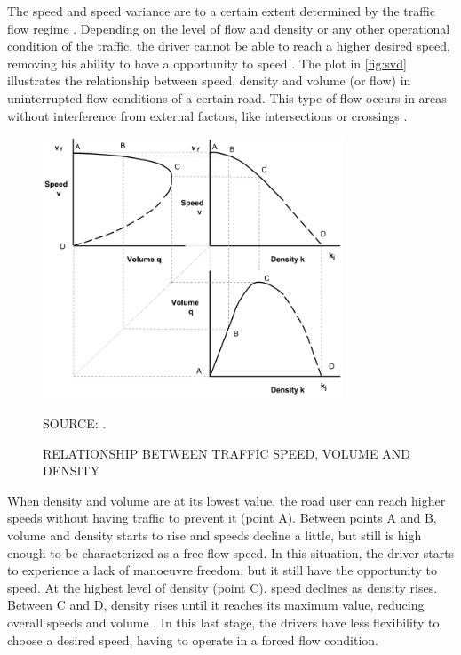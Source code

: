 The speed and speed variance are to a certain extent determined by the traffic flow regime \cite{Shinar2017}. Depending on the level of flow and density or any other operational condition of the traffic, the driver cannot be able to reach a higher desired speed, removing his ability to have a opportunity to speed \cite{Richard2013a, Bastos2021}. The plot in \autoref{fig:svd} illustrates the relationship between speed, density and volume (or flow) in uninterrupted flow conditions of a certain road. This type of flow occurs in areas without interference from external factors, like intersections or crossings \cite{Green2020}. 

\begin{figure}[!htbp]
    \centering\footnotesize
    \captionsetup{font=footnotesize}
    \caption{RELATIONSHIP BETWEEN TRAFFIC SPEED, VOLUME AND DENSITY}
    \includegraphics[width=0.8\textwidth]{fig/svd.png}
    \label{fig:svd}
    \par SOURCE: \textcite{Green2020}.
\end{figure}

When density and volume are at its lowest value, the road user can reach higher speeds without having traffic to prevent it (point A). Between points A and B, volume and density starts to rise and speeds decline a little, but still is high enough to be characterized as a free flow speed. In this situation, the driver starts to experience a lack of manoeuvre freedom, but it still have the opportunity to speed. At the highest level of density (point C), speed declines as density rises. Between C and D, density rises until it reaches its maximum value, reducing overall speeds and volume \cite{Green2020}. In this last stage, the drivers have less flexibility to choose a desired speed, having to operate in a forced flow condition. 

